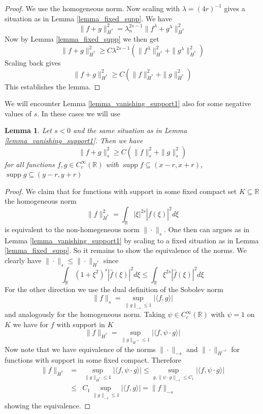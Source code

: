 \documentclass[11pt]{amsart}
\numberwithin{equation}{section}
\newtheorem{lemma}[theorem]{Lemma}
\begin{document}
\begin{proof}
	We use the homogeneous norm. Now scaling with $\lambda=(4r)^{-1}$ gives a situation as in Lemma \ref{lemma_fixed_supp}. We have
	\[
	\|f+g\|_{\dot H^s}^2 = \lambda_n^{2s-1} \|f^{\lambda}+g^{\lambda}\|_{\dot H^s}^2 
	\]
	Now by Lemma \ref{lemma_fixed_supp} we then get
	\[
	\|f+g\|_{\dot H^s}^2 \geq C \lambda^{2s-1} \left(\|f^{\lambda}\|_{\dot H^s}^2+\|g^{\lambda}\|_{\dot H^s}^2 \right)
	\]
	Scaling back gives
	\[
	\|f+g\|_{\dot H^s}^2 \geq C (\|f\|_{\dot H^s}^2+\|g\|_{\dot H^s}^2)
	\]
	This establishes the lemma.
\end{proof}

We will encounter Lemma \ref{lemma_vanishing_support1} also for some negative values of $s$. In these cases we will use

\begin{lemma}\label{lemma_vanishing_support2}
	Let $s <0$ and the same situation as in Lemma \ref{lemma_vanishing_support1}. Then we have 
	\[
	\|f+g\|_s^2 \geq C (\|f\|_s^2+\|g\|_s^2)
	\]
	for all functions $f,g \in C^\infty_c(\mathbb R)$ with $\operatorname{supp}f \subseteq (x-r,x+r)$, $\operatorname{supp}g \subseteq (y-r,y+r)$
\end{lemma}

\begin{proof}
	We claim that for functions with support in some fixed compact set $K \subseteq \mathbb R$ the homogeneous norm
	\[
	\|f\|_{\dot H^s}^2 = \int_\mathbb R |\xi|^{2s} |\hat f(\xi)|^2 d\xi
	\]
	is equivalent to the non-homegeneous norm $\|\cdot\|_s$. One then can argues as in Lemma \ref{lemma_vanishing_support1} by scaling to a fixed situation as in Lemma \ref{lemma_fixed_supp}. So it remains to show the equivalence of the norms. We clearly have $\|\cdot\|_s \leq \|\cdot\|_{\dot H^s}$ since
	\[
	\int_\mathbb R (1+\xi^2)^s |\hat f(\xi)|^2 d\xi \leq \int_\mathbb R \xi^{2s} |\hat f(\xi)|^2 d\xi
	\]
	For the other direction we use the dual definition of the Sobolev norm
	\[
	\|f\|_s = \sup_{\|g\|_{-s} \leq  1} |\langle f,g \rangle|
	\]
	and analogously for the homogeneous norm. Taking $\psi \in C_c^\infty(\mathbb R)$ with $\psi=1$ on $K$ we have for $f$ with support in $K$
	\[
	\|f\|_{\dot H^s} = \sup_{\|g\|_{\dot H^{-s}}\leq 1} |\langle f, \psi \cdot g \rangle|
	\]
	Now note that we have equivalence of the norms $\|\cdot\|_{-s}$ and $\|\cdot\|_{\dot H^{-s}}$ for functions with support in some fixed compact. Therefore
	\begin{eqnarray*}
		\|f\|_{\dot H^s} &=& \sup_{\|g\|_{\dot H^s} \leq 1} |\langle f, \psi \cdot g \rangle| \leq \sup_{g,\|\psi \cdot g\|_{-s} \leq C_1} |\langle f, \psi \cdot g \rangle| \\ &\leq& C_1 \sup_{\|g\|_{-s} \leq 1} |\langle f, g \rangle|
		=\|f\|_{-s}
	\end{eqnarray*}
	showing the equivalence.
\end{proof}
\end{document}
